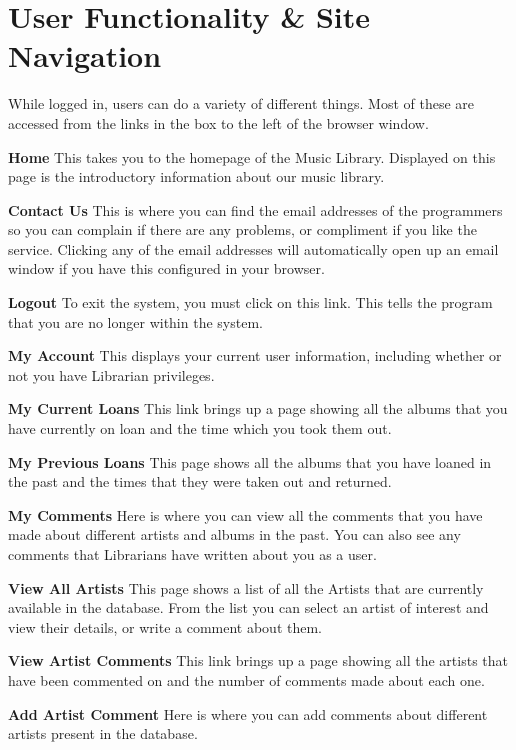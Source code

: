 \documentclass{article}
\begin{document}
\section{User Functionality \& Site Navigation}
While logged in, users can do a variety of different things. Most of these are accessed from the links in the box to the left of the browser window.
\begin{description}
\item{\bf{Home}}
This takes you to the homepage of the Music Library. Displayed on this page is the introductory information about our music library.
\item{\bf{Contact Us}}
This is where you can find the email addresses of the programmers so you can complain if there are any problems, or compliment if you like the service. Clicking any of the email addresses will automatically open up an email window if you have this configured in your browser.

\item{\bf{Logout}}
To exit the system, you must click on this link. This tells the program that you are no longer within the system.
\item{\bf{My Account}}
This displays your current user information, including whether or not you have Librarian privileges.
\item{\bf{My Current Loans}}
This link brings up a page showing all the albums that you have currently on loan and the time which you took them out.
\item{\bf{My Previous Loans}}
This page shows all the albums that you have loaned in the past and the times that they were taken out and returned.
\item{\bf{My Comments}}
Here is where you can view all the comments that you have made about different artists and albums in the past. You can also see any comments that Librarians have written about you as a user.
\item{\bf{View All Artists}}
This page shows a list of all the Artists that are currently available in the database. From the list you can select an artist of interest and view their details, or write a comment about them.
\item{\bf{View Artist Comments}}
This link brings up a page showing all the artists that have been commented on and the number of comments made about each one.
\item{\bf{Add Artist Comment}}
Here is where you can add comments about different artists present in the database.


\end{description}
\end{document}
